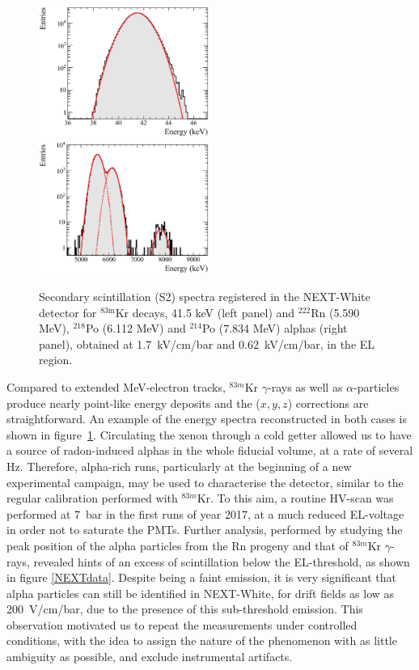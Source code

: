 \documentclass[%
 reprint,
superscriptaddress,
 amsmath,amssymb,
 aps,
]{revtex4-2}
\begin{document}
\begin{figure}[tbp]
\centering
\includegraphics[width=0.495\textwidth]{Fig4a.eps}
\includegraphics[width=0.495\textwidth]{Fig4b.eps}
\caption{Secondary scintillation (S2) spectra registered in the NEXT-White detector for $^{83\mathrm{m}}$Kr decays, 41.5 keV (left panel) and $^{222}$Rn (5.590 MeV), $^{218}$Po (6.112 MeV) and $^{214}$Po (7.834 MeV) alphas (right panel), obtained at 1.7~kV/cm/bar and 0.62~kV/cm/bar, in the EL region.} 
\label{fig:new_s2_spectra}
\end{figure}

Compared to extended MeV-electron tracks, $^{83m}$Kr $\gamma$-rays as well as $\alpha$-particles produce nearly point-like energy deposits and the ($x, y, z$) corrections are straightforward. An example of the energy spectra reconstructed in both cases is shown in figure~\ref{fig:new_s2_spectra}. Circulating the xenon through a cold getter \cite{SAES} allowed us to have a source of radon-induced alphas in the whole fiducial volume, at a rate of several Hz. Therefore, alpha-rich runs, particularly at the beginning of a new experimental campaign, may be used to characterise the detector, similar to the regular calibration performed with $^{83m}$Kr. To this aim, a routine HV-scan was performed at 7~bar in the first runs of year 2017, at a much reduced EL-voltage in order not to saturate the PMTs. Further analysis, performed by studying the peak position of the alpha particles from the Rn progeny and that of $^{83m}$Kr $\gamma$-rays, revealed hints of an excess of scintillation below the EL-threshold, as shown in figure \ref{NEXTdata}.
Despite being a faint emission, it is very significant that alpha particles can still be identified in NEXT-White, for drift fields as low as 200~V/cm/bar, due to the presence of this sub-threshold emission. This observation motivated us to repeat the measurements under controlled conditions, with the idea to assign the nature of the phenomenon with as little ambiguity as possible, and exclude instrumental artifacts.
\end{document}

